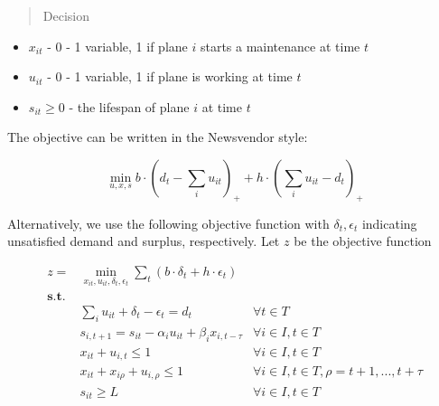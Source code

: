 \documentclass[../main]{subfiles}
\begin{document}
\begin{quote}
  Decision
\end{quote}

\begin{itemize}
  \tightlist
  \item
        \(x_{it}\) - 0 - 1 variable, 1 if plane \(i\) starts a maintenance at
        time \(t\)
  \item
        \(u_{it}\) - 0 - 1 variable, 1 if plane is working at time \(t\)
  \item
        \(s_{it} \ge 0\) - the lifespan of plane \(i\) at time \(t\)
\end{itemize}


The objective can be written in the Newsvendor style:

\[\min_{u,x,s} b \cdot (d_t - \sum_i u_{it})_+ + h \cdot  ( \sum_i u_{it} - d_t)_+ \]

Alternatively, we use the following objective function with
\(\delta_t, \epsilon_t\) indicating unsatisfied demand and surplus,
respectively. Let \(z\) be the objective function

\[\begin{aligned}
    z =           & \min_{x_{it}, u_{it}, \delta_t, \epsilon_t} \sum_t (b\cdot  \delta_t + h \cdot \epsilon_t)                                                       \\
    \mathbf{s.t.} &                                                                                                                                                  \\
                  & \sum_i u_{it} + \delta_t - \epsilon_t = d_t                                                & \forall t \in T                                     \\
                  & s_{i, t+1} =  s_{i t}  - \alpha_i  u_{it} + \beta_i  x_{i, t- \tau}                        & \forall i \in I, t \in T                            \\
                  & x_{it} +  u_{i, t} \le 1                                                                   & \forall i \in I, t \in T                            \\
                  & x_{it} + x_{i\rho} + u_{i, \rho} \le 1                                                     & \forall i \in I,  t\in T, \rho = t + 1, ..., t+\tau \\
                  & s_{i t} \ge L                                                                              & \forall i \in I, t \in T
  \end{aligned}\]
\end{document}
